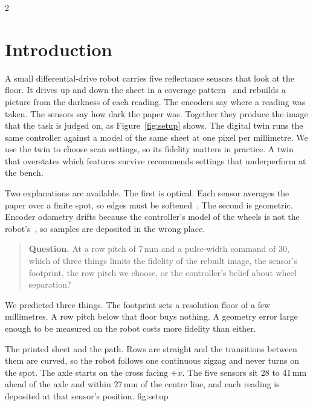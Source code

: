 \documentclass[a4paper,10pt]{article}
\begin{document}
\PaperTitleBlock

\begin{multicols*}{2}
\raggedcolumns

\section{Introduction}
A small differential-drive robot carries five reflectance sensors that look at
the floor. It drives up and down the sheet in a coverage pattern~\cite{choset} and
rebuilds a picture from the darkness of each reading. The encoders say where a reading was taken. The
sensors say how dark the paper was. Together they produce the image that the
task is judged on, as Figure~\ref{fig:setup} shows. The digital twin runs the
same controller against a model of the same sheet at one pixel per millimetre.
We use the twin to choose scan settings, so its fidelity matters in practice. A
twin that overstates which features survive recommends settings that
underperform at the bench.

Two explanations are available. The first is optical. Each sensor averages the
paper over a finite spot, so edges must be softened~\cite{richardson,lucy}. The
second is geometric. Encoder odometry drifts because the controller's model of
the wheels is not the robot's~\cite{borenstein,thrun}, so samples are deposited
in the wrong place.

\begin{quote}
\small\textbf{Question.} At a row pitch of 7\,mm and a pulse-width command of 30,
which of three things limits the fidelity of the rebuilt image, the sensor's
footprint, the row pitch we choose, or the controller's belief about wheel
separation?
\end{quote}

We predicted three things. The footprint sets a resolution floor of a few
millimetres. A row pitch below that floor buys nothing. A geometry error large
enough to be measured on the robot costs more fidelity than either.

%
{The printed sheet and the path. Rows are straight and the transitions between
them are curved, so the robot follows one continuous zigzag and never turns on
the spot. The axle starts on the cross facing $+x$. The five sensors sit 28 to
41\,mm ahead of the axle and within 27\,mm of the centre line, and each reading
is deposited at that sensor's position.}
{fig:setup}


\end{multicols*}
\end{document}
